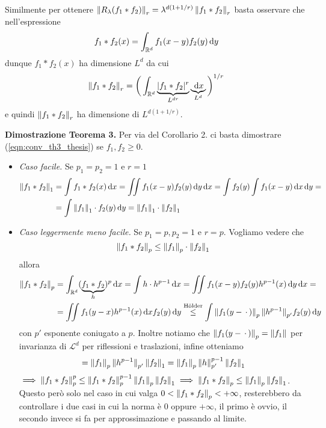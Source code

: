 \documentclass[a4paper, 12pt]{report}
\begin{document}
\begin{itemize}
		Similmente per ottenere $\left\lVert R_\lambda(f_1 \ast f_2) \right\rVert_r = \lambda^{d(1 + 1 / r)} \left\lVert f_1 \ast f_2 \right\rVert_r$ basta osservare che nell'espressione
		$$
		f_1 \ast f_2 (x) = \int_{\mathbb R^d} f_1(x - y) f_2(y) \,\mathrm{d} y
		$$
		dunque $f_1 \ast f_2 (x)$ ha dimensione $L^d$ da cui
		$$
		\left\lVert f_1 \ast f_2 \right\rVert_r = \bigg( \int_{\mathbb R^d} \underbrace{|f_1 \ast f_2|^r}_{L^{dr}} \underbrace{\,\mathrm{d} x}_{L^d} \bigg)^{1 / r}
		$$
		e quindi $\left\lVert f_1 \ast f_2 \right\rVert_r$ ha dimensione di $L^{d(1 + 1/r)}$.
\end{itemize}

\textbf{Dimostrazione Teorema 3.}
Per via del Corollario 2. ci basta dimostrare (\ref{eqn:conv_th3_thesis}) se $f_1, f_2 \geq 0$.
\begin{itemize}
	\item
		\textit{Caso facile.} Se $p_1 = p_2 = 1$ e $r = 1$
		$$
		\begin{aligned}
			\left\lVert f_1 \ast f_2 \right\rVert_1
			&= \int f_1 \ast f_2 (x) \,\mathrm{d} x 
			= \iint f_1(x - y) f_2(y) \,\mathrm{d} y \,\mathrm{d} x 
			= \int f_2(y) \int f_1(x - y) \,\mathrm{d} x \,\mathrm{d} y = \\
			&= \int \left\lVert f_1 \right\rVert_1 \cdot f_2(y) \,\mathrm{d} y 
			= \left\lVert f_1 \right\rVert_1 \cdot \left\lVert f_2 \right\rVert_1
		\end{aligned}
		$$

	\item
		\textit{Caso leggermente meno facile.} Se $p_1 = p, p_2 = 1$ e $r = p$.
		Vogliamo vedere che
		$$
		\left\lVert f_1 \ast f_2 \right\rVert_p \leq \left\lVert f_1 \right\rVert_p \cdot \left\lVert f_2 \right\rVert_1
		$$
		allora
		$$
		\begin{aligned}
			\left\lVert f_1 \ast f_2 \right\rVert_p
			&= \int_{\mathbb R^d} (\underbrace{f_1 \ast f_2}_{h})^p \,\mathrm{d} x
			= \int h \cdot h^{p-1} \,\mathrm{d} x 
			= \iint f_1(x - y) f_2(y) h^{p-1}(x) \,\mathrm{d} y \,\mathrm{d} x = \\
			&= \iint f_1(y - x) h^{p-1}(x) \,\mathrm{d} x f_2(y) \,\mathrm{d} y 
			\overset{\text{H\"older}}{\leq} 
			\int \left\lVert f_1(y - \,\cdot\,) \right\rVert_p {\| h^{p-1} \|}_{p'} f_2(y) \,\mathrm{d} y
		\end{aligned}
		$$
		con $p'$ esponente coniugato a $p$. Inoltre notiamo che $\left\lVert f_1(y - \,\cdot\,) \right\rVert_p = \left\lVert f_1 \right\rVert$ per invarianza di $\mathscr L^d$ per riflessioni e traslazioni, infine otteniamo
		$$
		= \left\lVert f_1 \right\rVert_p {\| h^{p-1} \|}_{p'} \left\lVert f_2 \right\rVert_1
		= \left\lVert f_1 \right\rVert_p \left\lVert h \right\rVert_{p'}^{p-1} \left\lVert f_2 \right\rVert_1
		$$
		$\implies \left\lVert f_1 \ast f_2 \right\rVert_p^p \leq \left\lVert f_1 \ast f_2 \right\rVert_p^{p-1} \left\lVert f_1 \right\rVert_p \left\lVert f_2 \right\rVert_1 \implies \left\lVert f_1 \ast f_2 \right\rVert_p \leq \left\lVert f_1 \right\rVert_p \left\lVert f_2 \right\rVert_1$. Questo però solo nel caso in cui valga $0 < \left\lVert f_1 \ast f_2 \right\rVert_p < +\infty$, resterebbero da controllare i due casi in cui la norma è $0$ oppure $+\infty$, il primo è ovvio, il secondo invece si fa per approssimazione e passando al limite.


\end{itemize}
\end{document}
